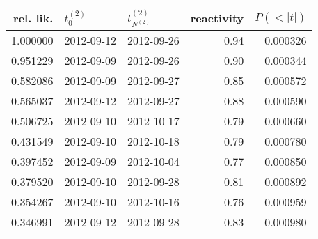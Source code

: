 \begin{tabular}{rllrr}
\toprule
 rel. lik. & $t_0^{(2)}$ & $t^{(2)}_{N^{(2)}}$ & reactivity &  $P(<|t|)$ \\
\midrule
  1.000000 &  2012-09-12 &          2012-09-26 &       0.94 &   0.000326 \\
  0.951229 &  2012-09-09 &          2012-09-26 &       0.90 &   0.000344 \\
  0.582086 &  2012-09-09 &          2012-09-27 &       0.85 &   0.000572 \\
  0.565037 &  2012-09-12 &          2012-09-27 &       0.88 &   0.000590 \\
  0.506725 &  2012-09-10 &          2012-10-17 &       0.79 &   0.000660 \\
  0.431549 &  2012-09-10 &          2012-10-18 &       0.79 &   0.000780 \\
  0.397452 &  2012-09-09 &          2012-10-04 &       0.77 &   0.000850 \\
  0.379520 &  2012-09-10 &          2012-09-28 &       0.81 &   0.000892 \\
  0.354267 &  2012-09-10 &          2012-10-16 &       0.76 &   0.000959 \\
  0.346991 &  2012-09-12 &          2012-09-28 &       0.83 &   0.000980 \\
\bottomrule
\end{tabular}
